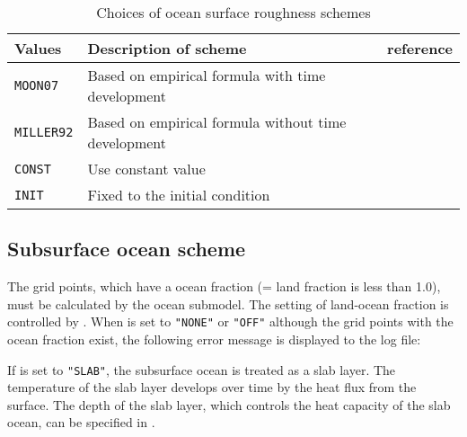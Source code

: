 \begin{table}[h]
\begin{center}
  \caption{Choices of ocean surface roughness schemes}
  \label{tab:nml_ocean_rgn}
  \begin{tabularx}{150mm}{llX} \hline
    \rowcolor[gray]{0.9}  Values & Description of scheme & reference \\ \hline
      \verb|MOON07|   & Based on empirical formula with time development    & \citet{moon_2007} \\
      \verb|MILLER92| & Based on empirical formula without time development & \citet{miller_1992} \\
      \verb|CONST|    & Use constant value \\
      \verb|INIT|     & Fixed to the initial condition \\
    \hline
  \end{tabularx}
\end{center}
\end{table}


\clearpage
\subsection{Subsurface ocean scheme}

The grid points, which have a ocean fraction (= land fraction is less than 1.0), must be calculated by the ocean submodel. The setting of land-ocean fraction is controlled by .
When  is set to \verb|"NONE"| or \verb|"OFF"| although the grid points with the ocean fraction exist, the following error message is displayed to the log file:


If  is set to \verb|"SLAB"|, the subsurface ocean is treated as a slab layer. The temperature of the slab layer develops over time by the heat flux from the surface. The depth of the slab layer, which controls the heat capacity of the slab ocean, can be specified  in .


